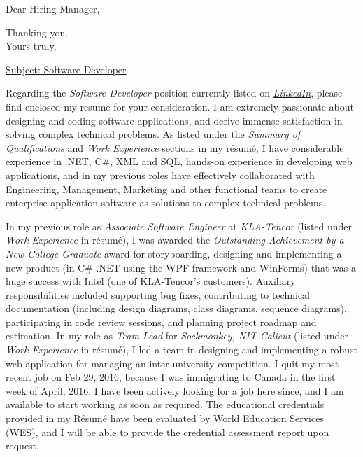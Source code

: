 \date{September 23, 2016}
\opening{Dear Hiring Manager,}
\closing{Thanking you.\\Yours truly,}
\makelettertitle

\underline{Subject: Software Developer}
\newline 

Regarding the \emph{Software Developer} position currently listed on \href{https://www.linkedin.com/jobs/view/205365298?refId=6f630c4d-b372-4e20-bc6a-87deafcbac25}{\emph{LinkedIn}}, please find enclosed my resume for your consideration. I am extremely passionate about designing and coding software applications, and derive immense satisfaction in solving complex technical problems. As listed under the \emph{Summary of Qualifications} and \emph{Work Experience} sections in my résumé, I have considerable experience in .NET, C\#, XML and  SQL, hands-on experience in developing web applications, and in my previous roles have effectively collaborated with Engineering, Management, Marketing and other functional teams to create enterprise application software as solutions to complex technical problems.

In my previous role as \emph{Associate Software Engineer} at \emph{KLA-Tencor} (listed under \emph{Work Experience} in résumé), I was awarded the \emph{Outstanding Achievement by a New College Graduate} award for storyboarding, designing and implementing a new product (in C\# .NET using the WPF framework and WinForms) that was a huge success with Intel (one of KLA-Tencor's customers). Auxiliary responsibilities included supporting bug fixes, contributing to technical documentation (including design diagrams, class diagrams, sequence diagrams), participating in code review sessions, and planning project roadmap and estimation. In my role as \emph{Team Lead} for \emph{Sockmonkey, NIT Calicut} (listed under \emph{Work Experience} in résumé), I led a team in designing and implementing a robust web application for managing an inter-university competition. I quit my most recent job on Feb 29, 2016, because I was immigrating to Canada in the first week of April, 2016. I have been actively looking for a job here since, and I am available to start working as soon as required. The educational credentials provided in my Résumé have been evaluated by World Education Services (WES), and I will be able to provide the credential assessment report upon request.


